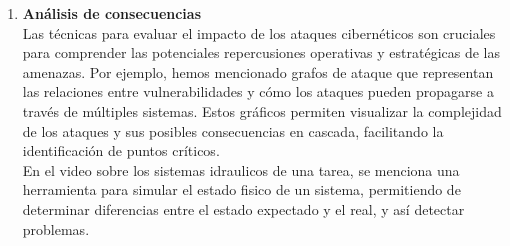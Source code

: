 \begin{enumerate}[resume]
\item \textbf{Análisis de consecuencias} \\
Las técnicas para evaluar el impacto de los ataques cibernéticos son cruciales para comprender las potenciales repercusiones operativas y estratégicas de las amenazas.
Por ejemplo, hemos mencionado grafos de ataque que representan las relaciones entre vulnerabilidades y cómo los ataques pueden propagarse a través de múltiples sistemas. Estos gráficos permiten visualizar la complejidad de los ataques y sus posibles consecuencias en cascada, facilitando la identificación de puntos críticos.\\
En el video sobre los sistemas idraulicos de una tarea, se menciona una herramienta para simular el estado fisico de un sistema, permitiendo de determinar diferencias entre el estado expectado y el real, y así detectar problemas.
\end{enumerate}


